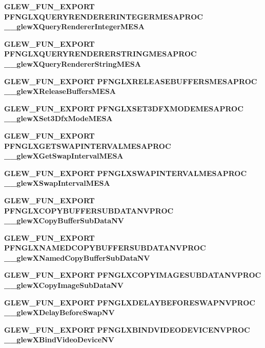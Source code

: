 \begin{DoxyCompactItemize}
\item 
{\bf G\+L\+E\+W\+\_\+\+F\+U\+N\+\_\+\+E\+X\+P\+O\+RT} {\bf P\+F\+N\+G\+L\+X\+Q\+U\+E\+R\+Y\+R\+E\+N\+D\+E\+R\+E\+R\+I\+N\+T\+E\+G\+E\+R\+M\+E\+S\+A\+P\+R\+OC} {\bf \+\_\+\+\_\+glew\+X\+Query\+Renderer\+Integer\+M\+E\+SA}
\item 
{\bf G\+L\+E\+W\+\_\+\+F\+U\+N\+\_\+\+E\+X\+P\+O\+RT} {\bf P\+F\+N\+G\+L\+X\+Q\+U\+E\+R\+Y\+R\+E\+N\+D\+E\+R\+E\+R\+S\+T\+R\+I\+N\+G\+M\+E\+S\+A\+P\+R\+OC} {\bf \+\_\+\+\_\+glew\+X\+Query\+Renderer\+String\+M\+E\+SA}
\item 
{\bf G\+L\+E\+W\+\_\+\+F\+U\+N\+\_\+\+E\+X\+P\+O\+RT} {\bf P\+F\+N\+G\+L\+X\+R\+E\+L\+E\+A\+S\+E\+B\+U\+F\+F\+E\+R\+S\+M\+E\+S\+A\+P\+R\+OC} {\bf \+\_\+\+\_\+glew\+X\+Release\+Buffers\+M\+E\+SA}
\item 
{\bf G\+L\+E\+W\+\_\+\+F\+U\+N\+\_\+\+E\+X\+P\+O\+RT} {\bf P\+F\+N\+G\+L\+X\+S\+E\+T3\+D\+F\+X\+M\+O\+D\+E\+M\+E\+S\+A\+P\+R\+OC} {\bf \+\_\+\+\_\+glew\+X\+Set3\+Dfx\+Mode\+M\+E\+SA}
\item 
{\bf G\+L\+E\+W\+\_\+\+F\+U\+N\+\_\+\+E\+X\+P\+O\+RT} {\bf P\+F\+N\+G\+L\+X\+G\+E\+T\+S\+W\+A\+P\+I\+N\+T\+E\+R\+V\+A\+L\+M\+E\+S\+A\+P\+R\+OC} {\bf \+\_\+\+\_\+glew\+X\+Get\+Swap\+Interval\+M\+E\+SA}
\item 
{\bf G\+L\+E\+W\+\_\+\+F\+U\+N\+\_\+\+E\+X\+P\+O\+RT} {\bf P\+F\+N\+G\+L\+X\+S\+W\+A\+P\+I\+N\+T\+E\+R\+V\+A\+L\+M\+E\+S\+A\+P\+R\+OC} {\bf \+\_\+\+\_\+glew\+X\+Swap\+Interval\+M\+E\+SA}
\item 
{\bf G\+L\+E\+W\+\_\+\+F\+U\+N\+\_\+\+E\+X\+P\+O\+RT} {\bf P\+F\+N\+G\+L\+X\+C\+O\+P\+Y\+B\+U\+F\+F\+E\+R\+S\+U\+B\+D\+A\+T\+A\+N\+V\+P\+R\+OC} {\bf \+\_\+\+\_\+glew\+X\+Copy\+Buffer\+Sub\+Data\+NV}
\item 
{\bf G\+L\+E\+W\+\_\+\+F\+U\+N\+\_\+\+E\+X\+P\+O\+RT} {\bf P\+F\+N\+G\+L\+X\+N\+A\+M\+E\+D\+C\+O\+P\+Y\+B\+U\+F\+F\+E\+R\+S\+U\+B\+D\+A\+T\+A\+N\+V\+P\+R\+OC} {\bf \+\_\+\+\_\+glew\+X\+Named\+Copy\+Buffer\+Sub\+Data\+NV}
\item 
{\bf G\+L\+E\+W\+\_\+\+F\+U\+N\+\_\+\+E\+X\+P\+O\+RT} {\bf P\+F\+N\+G\+L\+X\+C\+O\+P\+Y\+I\+M\+A\+G\+E\+S\+U\+B\+D\+A\+T\+A\+N\+V\+P\+R\+OC} {\bf \+\_\+\+\_\+glew\+X\+Copy\+Image\+Sub\+Data\+NV}
\item 
{\bf G\+L\+E\+W\+\_\+\+F\+U\+N\+\_\+\+E\+X\+P\+O\+RT} {\bf P\+F\+N\+G\+L\+X\+D\+E\+L\+A\+Y\+B\+E\+F\+O\+R\+E\+S\+W\+A\+P\+N\+V\+P\+R\+OC} {\bf \+\_\+\+\_\+glew\+X\+Delay\+Before\+Swap\+NV}
\item 
{\bf G\+L\+E\+W\+\_\+\+F\+U\+N\+\_\+\+E\+X\+P\+O\+RT} {\bf P\+F\+N\+G\+L\+X\+B\+I\+N\+D\+V\+I\+D\+E\+O\+D\+E\+V\+I\+C\+E\+N\+V\+P\+R\+OC} {\bf \+\_\+\+\_\+glew\+X\+Bind\+Video\+Device\+NV}

\end{DoxyCompactItemize}
